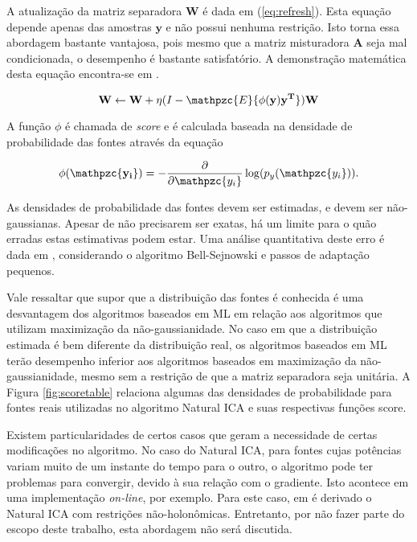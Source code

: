     A atualização da matriz separadora $\mathbf{W}$ é dada em (\ref{eq:refresh}). Esta equação depende apenas das amostras $\mathbf{y}$ e não possui nenhuma restrição. Isto torna essa abordagem bastante vantajosa, pois mesmo que a matriz misturadora $\mathbf{A}$ seja mal condicionada, o desempenho é bastante satisfatório. A demonstração matemática desta equação encontra-se em \cite{ICA3}.
    
    \begin{equation}
    \label{eq:refresh}
    \mathbf{W} \leftarrow \mathbf{W} + \eta(I - \mathpzc{E}\{\phi({\mathbf{y})\mathbf{y^T}}\})\mathbf{W}
    \end{equation}
    
    A função $\phi$ é chamada de \textit{score} e é calculada baseada na densidade de probabilidade das fontes através da equação
    
    \begin{equation}
    \label{eq:score}
    \mathbf{\phi({\mathpzc{y_i}})} = - \frac{\partial}{\partial \mathpzc{y_i}} \log(p_y(\mathpzc{y_i})).
    \end{equation}
    
    As densidades de probabilidade das fontes devem ser estimadas, e devem ser não-gaussianas. Apesar de não precisarem ser exatas, há um limite para o quão erradas estas estimativas podem estar. Uma análise quantitativa deste erro é dada em \cite{ICA3}, considerando o algoritmo Bell-Sejnowski e passos de adaptação pequenos.
    
    Vale ressaltar que supor que a distribuição das fontes é conhecida é uma desvantagem dos algoritmos baseados em ML em relação aos algoritmos que utilizam maximização da não-gaussianidade. No caso em que a distribuição estimada é bem diferente da distribuição real, os algoritmos baseados em ML terão desempenho inferior aos algoritmos baseados em maximização da não-gaussianidade, mesmo sem a restrição de que a matriz separadora seja unitária. A Figura \ref{fig:scoretable} relaciona algumas das densidades de probabilidade para fontes reais utilizadas no algoritmo Natural ICA e suas respectivas funções score.
    
    Existem particularidades de certos casos que geram a necessidade de certas modificações no algoritmo. No caso do Natural ICA, para fontes cujas potências variam muito de um instante do tempo para o outro, o algoritmo pode ter problemas para convergir, devido à sua relação com o gradiente. Isto acontece em uma implementação \textit{on-line}, por exemplo. Para este caso, em \cite{holonomic} é derivado o Natural ICA com restrições não-holonômicas. Entretanto, por não fazer parte do escopo deste trabalho, esta abordagem não será discutida.


